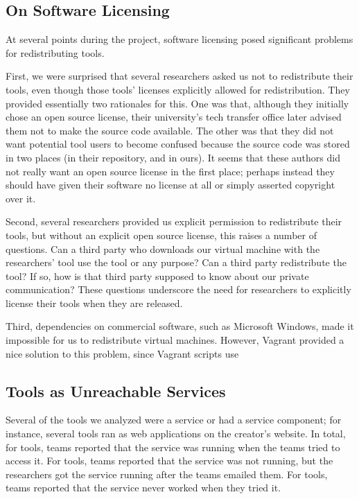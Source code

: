 \documentclass[10pt,conference]{IEEEtran}
\begin{document}
\subsection{On Software Licensing}

At several points during the project, software licensing posed significant
problems for redistributing tools.

First, we were surprised that several researchers asked us not to redistribute
their tools, even though those tools' licenses explicitly allowed for redistribution.
They provided essentially two rationales for this.
One was that, although they initially chose an open source license, 
their university's tech transfer office later advised them not to make the source code available.
The other was that they did not want potential tool users to become confused 
because the source code was stored in two places (in their repository, and in ours).
It seems that these authors did not really want an open source license
in the first place; perhaps instead they should have given their software
no license at all or simply asserted copyright over it.

Second, several researchers provided us explicit permission to redistribute their tools,
but without an explicit open source license, this raises a number of questions.
Can a third party who downloads our virtual machine with the researchers' tool use the tool or any purpose?
Can a third party redistribute the tool?
If so, how is that third party supposed to know about our private communication?
These questions underscore the need for researchers to explicitly license their tools
when they are released.

Third, dependencies on commercial software, such as Microsoft Windows, made it
impossible for us to redistribute virtual machines.
However, Vagrant provided a nice solution to this problem, since Vagrant scripts
use

\subsection{Tools as Unreachable Services}

Several of the tools we analyzed were a service or had a
service component; for instance, several tools
ran as web applications on the creator's website.
In total, for \serviceRunning tools, teams 
reported that the service was running when the teams tried
to access it.
For \serviceRunningLater tools, teams reported that the service
was not running, but the researchers got the service running
after the teams emailed them.
For \serviceRunningNever tools, teams reported that the service
never worked when they tried it. 
\end{document}
